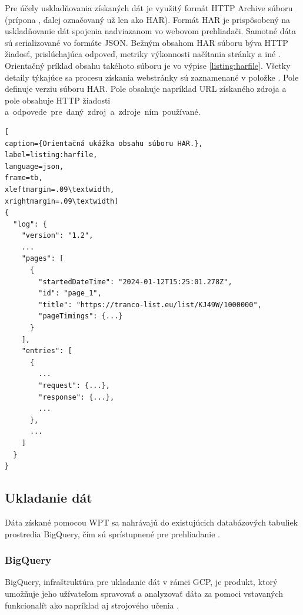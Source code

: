 Pre účely uskladňovania získaných dát je využitý formát HTTP Archive súboru (prípona , ďalej označovaný už len ako HAR).
Formát HAR je prispôsobený na uskladňovanie dát spojenia nadviazanom vo webovom prehliadači. Samotné dáta sú serializované vo formáte JSON.
Bežným obsahom HAR súboru býva HTTP žiadosť, prislúchajúca odpoveď, metriky výkonnosti načítania stránky a iné \cite{httparchive-harfile}. 
Orientačný príklad obsahu takéhoto súboru je vo výpise \ref{listing:harfile}.
Všetky detaily týkajúce sa procesu získania webstránky sú zaznamenané v položke . Pole  definuje verziu súboru HAR. Pole  obsahuje napríklad URL získaného zdroja a pole  obsahuje HTTP žiadosti \mbox{a odpovede pre daný zdroj a zdroje ním používané.}

\begin{center}
\centering
\begin{lstlisting}[
caption={Orientačná ukážka obsahu súboru HAR.},
label=listing:harfile, 
language=json, 
frame=tb,
xleftmargin=.09\textwidth, 
xrightmargin=.09\textwidth]
{
  "log": {
    "version": "1.2",
    ...
    "pages": [
      {
        "startedDateTime": "2024-01-12T15:25:01.278Z",
        "id": "page_1",
        "title": "https://tranco-list.eu/list/KJ49W/1000000",
        "pageTimings": {...}
      }
    ],
    "entries": [
      {
        ...
        "request": {...},
        "response": {...},
        ...
      },
      ...
    ]
  }
}
\end{lstlisting}
\end{center} 

\subsection{Ukladanie dát}
\label{httparchive-data-storage}

Dáta získané pomocou WPT sa nahrávajú do existujúcich databázových tabuliek prostredia BigQuery, čím sú sprístupnené pre prehliadanie \cite{httparchive-faq}.

\subsubsection{BigQuery}
\label{big-query}

BigQuery, infraštruktúra pre ukladanie dát v rámci GCP, je produkt, ktorý umožňuje jeho užívateľom spravovať a analyzovať dáta za pomoci vstavaných funkcionalít ako napríklad aj strojového učenia \cite{google-bq}.

